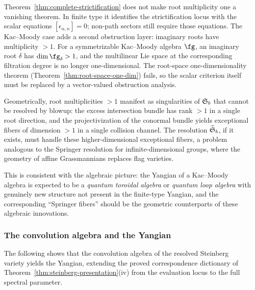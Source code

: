 \begin{remark}
\label{rem:kac-moody-root-mult}
Theorem~\ref{thm:complete-strictification} does not make root
multiplicity one a vanishing theorem. In finite type it identifies the
strictification locus with the scalar equations
$[\epsilon_{\alpha,n}]=0$; non-path sectors still require those
equations. The Kac--Moody case adds a second obstruction layer:
imaginary roots have multiplicity $> 1$. For a symmetrizable
Kac--Moody algebra $\fg$, an imaginary root $\delta$ has
$\dim \fg_\delta > 1$, and the multilinear Lie space at the
corresponding filtration degree is no longer one-dimensional.
The root-space one-dimensionality theorem
(Theorem~\ref{thm:root-space-one-dim}) fails, so the scalar criterion
itself must be replaced by a vector-valued obstruction analysis.

Geometrically, root multiplicities $> 1$ manifest as singularities of
$\mathfrak{S}_b$ that cannot be resolved by blowup: the excess
intersection bundle has rank $> 1$ in a single root direction, and the
projectivization of the conormal bundle yields exceptional fibers of
dimension $> 1$ in a single collision channel. The resolution
$\widetilde{\mathfrak{S}}_b$, if it exists, must handle these
higher-dimensional exceptional fibers, a problem analogous to the
Springer resolution for infinite-dimensional groups, where the geometry
of affine Grassmannians replaces flag varieties.

This is consistent with the algebraic picture: the Yangian of a
Kac--Moody algebra is expected to be a \emph{quantum toroidal algebra}
or \emph{quantum loop algebra} with genuinely new structure not present
in the finite-type Yangian, and the corresponding ``Springer fibers''
should be the geometric counterparts of these algebraic innovations.
\end{remark}

\subsubsection{The convolution algebra and the Yangian}
\label{sssec:convolution-yangian}

The following shows that the convolution algebra of the resolved Steinberg
variety yields the Yangian, extending the proved correspondence
dictionary of Theorem~\ref{thm:steinberg-presentation}(iv) from the
evaluation locus to the full spectral parameter.

